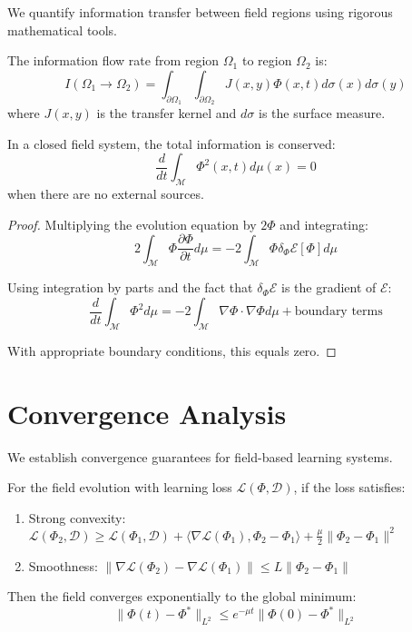We quantify information transfer between field regions using rigorous mathematical tools.

\begin{definition}
\label{def:information_flow_rate}
The information flow rate from region $\Omega_1$ to region $\Omega_2$ is:
$$I(\Omega_1 \to \Omega_2) = \int_{\partial \Omega_1} \int_{\partial \Omega_2} J(x,y) \Phi(x,t) d\sigma(x) d\sigma(y)$$
where $J(x,y)$ is the transfer kernel and $d\sigma$ is the surface measure.
\end{definition}

\begin{theorem}
\label{thm:information_conservation}
In a closed field system, the total information is conserved:
$$\frac{d}{dt}\int_{\mathcal{M}} \Phi^2(x,t) d\mu(x) = 0$$
when there are no external sources.
\end{theorem}

\begin{proof}
Multiplying the evolution equation by $2\Phi$ and integrating:
$$2\int_{\mathcal{M}} \Phi \frac{\partial \Phi}{\partial t} d\mu = -2\int_{\mathcal{M}} \Phi \delta_\Phi \mathcal{E}[\Phi] d\mu$$

Using integration by parts and the fact that $\delta_\Phi \mathcal{E}$ is the gradient of $\mathcal{E}$:
$$\frac{d}{dt}\int_{\mathcal{M}} \Phi^2 d\mu = -2\int_{\mathcal{M}} \nabla \Phi \cdot \nabla \Phi d\mu + \text{boundary terms}$$

With appropriate boundary conditions, this equals zero.
\end{proof}

\section{Convergence Analysis}

We establish convergence guarantees for field-based learning systems.

\begin{theorem}
\label{thm:field_convergence}
For the field evolution with learning loss $\mathcal{L}(\Phi, \mathcal{D})$, if the loss satisfies:
\begin{enumerate}
\item Strong convexity: $\mathcal{L}(\Phi_2, \mathcal{D}) \geq \mathcal{L}(\Phi_1, \mathcal{D}) + \langle \nabla \mathcal{L}(\Phi_1), \Phi_2 - \Phi_1 \rangle + \frac{\mu}{2}\|\Phi_2 - \Phi_1\|^2$
\item Smoothness: $\|\nabla \mathcal{L}(\Phi_2) - \nabla \mathcal{L}(\Phi_1)\| \leq L\|\Phi_2 - \Phi_1\|$
\end{enumerate}
Then the field converges exponentially to the global minimum:
$$\|\Phi(t) - \Phi^*\|_{L^2} \leq e^{-\mu t}\|\Phi(0) - \Phi^*\|_{L^2}$$
\end{theorem}

